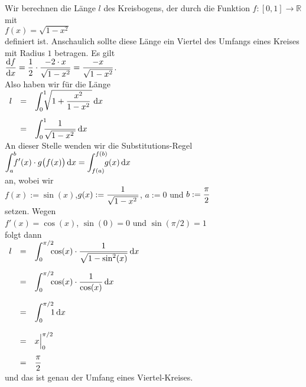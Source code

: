 \example
Wir berechnen die L\"ange $l$ des Kreisbogens, der durch die Funktion $f:[0,1] \rightarrow\mathbb{R}$ mit
\\[0.2cm]
\hspace*{1.3cm}
$f(x) = \sqrt{1 - x^2}$
\\[0.2cm]
definiert ist.  Anschaulich sollte diese L\"ange ein Viertel des Umfangs eines Kreises mit Radius $1$ betragen.
Es gilt
\\[0.2cm]
\hspace*{1.3cm}
$\displaystyle\frac{\mathrm{d}\/f}{\textrm{d} x} = \frac{1}{2} \cdot \frac{-2 \cdot x}{\sqrt{1 - x^2}} = 
                  \frac{- x}{\sqrt{1 - x^2}}
$.
\\[0.2cm]
Also haben wir f\"ur die L\"ange
\\[0.2cm]
\hspace*{1.3cm}
$
\begin{array}[t]{lcl}
l & = & \dint{0}{1} \sqrt{1 + \frac{x^2}{1 - x^2}\,}\, \dr x \\[0.5cm]
  & = & \dint{0}{1} \frac{1}{\sqrt{1 - x^2\,}}\, \dr x
\end{array}
$
\\[0.2cm]
An dieser Stelle wenden wir die Substitutions-Regel
\\[0.2cm]
\hspace*{1.3cm}
$\dint{a}{b} f'(x) \cdot  g\bigl(f(x)\bigr)\, \dr x = \dint{f(a)}{f(b)} g(x)\, \dr x$
\\[0.2cm]
an, wobei wir 
\\[0.2cm]
\hspace*{1.3cm}
$f(x) := \sin(x)$,\quad $g(x) := \displaystyle \frac{1}{\sqrt{1 - x^2\,}}$, 
\quad $a := 0$ \quad und \quad $b := \displaystyle \frac{\pi}{2}$
\\[0.2cm]
setzen. Wegen
\\[0.2cm]
\hspace*{1.3cm}
$f'(x) = \cos(x)$, \quad $\sin(0) = 0$ \quad und \quad $\sin(\pi/2) = 1$
\\[0.2cm]
folgt dann
\\[0.2cm]
\hspace*{1.3cm}
$
\begin{array}[t]{lcl}
l & = & \dint{0}{\pi/2} \cos(x) \cdot \frac{1}{\sqrt{1 - \sin^2(x)}}\, \dr x  \\[0.6cm]
  & = & \dint{0}{\pi/2} \cos(x) \cdot \frac{1}{\cos(x)}\, \dr x  \\[0.6cm]
  & = & \dint{0}{\pi/2} 1\, \dr x  \\[0.6cm]
  & = &  x \Bigl|_0^{\pi/2}  \\[0.4cm]
  & = & \ds \frac{\pi}{2}  
\end{array}
$
\\[0.2cm]
und das ist genau der Umfang eines Viertel-Kreises. \eod


